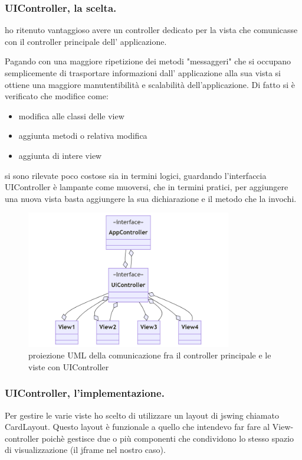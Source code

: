 \documentclass[a4paper,12pt]{report}
\begin{document}
\subsubsection{UIController, la scelta.}
ho ritenuto vantaggioso avere un controller dedicato per la vista  che comunicasse
con il controller principale dell' applicazione.

Pagando con una maggiore ripetizione dei metodi "messaggeri" che si occupano semplicemente di trasportare informazioni
dall' applicazione alla sua vista si ottiene una maggiore manutentibilità e scalabilità dell'applicazione.
Di fatto si è verificato che modifice come:
\begin{itemize}
    \item modifica alle classi delle view
    \item aggiunta metodi o relativa modifica
    \item aggiunta di intere view
\end{itemize}
si sono rilevate poco costose sia in termini logici, guardando l'interfaccia UIController è lampante come muoversi,
che in termini pratici, per aggiungere una nuova vista basta aggiungere la sua dichiarazione e il metodo che la invochi.
\begin{figure}[H]
    \centering
    \includegraphics[width=0.8\textwidth]{images/UiControllerDesing.png}
    \caption{proiezione UML della comunicazione fra il controller principale e le viste con UIController}
\end{figure}

\subsubsection{UIController, l'implementazione.}
Per gestire le varie viste ho scelto di utilizzare un layout di jswing chiamato CardLayout.
Questo layout è funzionale a quello che intendevo far fare al View-controller poichè
gestisce due o più componenti che condividono lo stesso spazio di visualizzazione (il jframe nel nostro caso).
\end{document}
